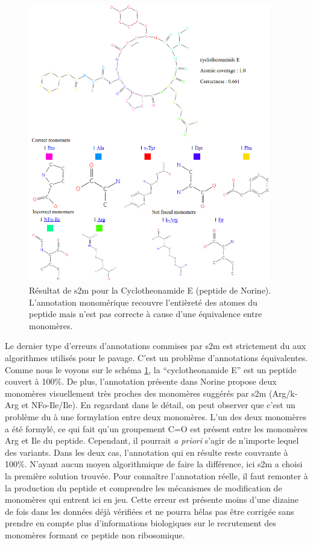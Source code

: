 \begin{figure}[h!]
  \begin{center}
    \includegraphics[width=400px]{Figures/s2m/results/cyclotheonamide.png}
    \caption{\label{cycloth}Résultat de s2m pour la Cyclotheonamide E (peptide de Norine).
    L'annotation monomérique recouvre l'entièreté des atomes du peptide mais n'est pas correcte à cause d'une équivalence entre monomères.}
  \end{center}
\end{figure}

Le dernier type d'erreurs d'annotations commises par s2m est strictement du aux algorithmes utilisés pour le pavage.
C'est un problème d'annotations équivalentes.
Comme nous le voyons sur le schéma \ref{cycloth}, la ``cyclotheonamide E'' est un peptide couvert à 100\%.
De plus, l'annotation présente dans Norine propose deux monomères visuellement très proches des monomères suggérés par s2m (Arg/k-Arg et NFo-Ile/Ile).
En regardant dans le détail, on peut observer que c'est un problème du à une formylation entre deux monomères.
L'un des deux monomères a été formylé, ce qui fait qu'un groupement C=O est présent entre les monomères Arg et Ile du peptide.
Cependant, il pourrait \textit{a priori} s'agir de n'importe lequel des variants.
Dans les deux cas, l'annotation qui en résulte reste couvrante à 100\%.
N'ayant aucun moyen algorithmique de faire la différence, ici s2m a choisi la première solution trouvée.
Pour connaître l'annotation réelle, il faut remonter à la production du peptide et comprendre les mécanismes de modification de monomères qui entrent ici en jeu.
Cette erreur est présente moins d'une dizaine de fois dans les données déjà vérifiées et ne pourra hélas pas être corrigée sans prendre en compte plus d'informations biologiques sur le recrutement des monomères formant ce peptide non ribosomique.



